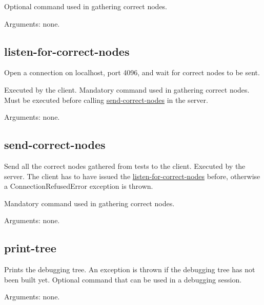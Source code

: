 Optional command used in gathering correct nodes.

Arguments: none.
\subsection{listen-for-correct-nodes}
\label{command:listen-for-correct-nodes}
Open a connection on localhost, port 4096, and wait for correct nodes to be sent.

Executed by the client.
Mandatory command used in gathering correct nodes.
Must be executed before calling \hyperref[command:send-correct-nodes]{send-correct-nodes} in the server.

Arguments: none.
\subsection{send-correct-nodes}
\label{command:send-correct-nodes}
Send all the correct nodes gathered from tests to the client.
Executed by the server.
The client has to have issued the \hyperref[command:listen-for-correct-nodes]{listen-for-correct-nodes} before, otherwise a ConnectionRefusedError exception is thrown.

Mandatory command used in gathering correct nodes.

Arguments: none.
\subsection{print-tree}
\label{command:print-tree}
Prints the debugging tree.
An exception is thrown if the debugging tree has not been built yet. 
Optional command that can be used in a debugging session.

Arguments: none.